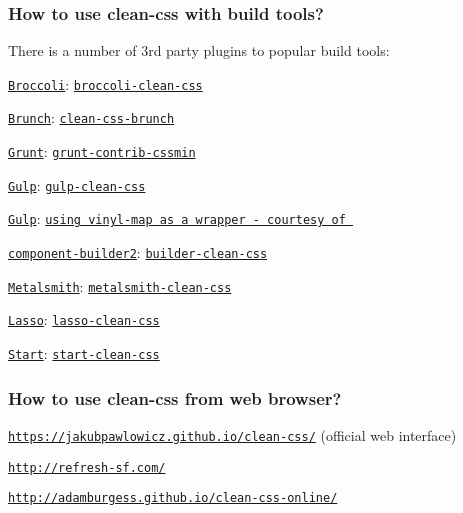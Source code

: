 \subsubsection*{How to use clean-\/css with build tools?}

There is a number of 3rd party plugins to popular build tools\+:


\begin{DoxyItemize}
\item \href{https://github.com/broccolijs/broccoli#broccoli}{\tt Broccoli}\+: \href{https://github.com/shinnn/broccoli-clean-css}{\tt broccoli-\/clean-\/css}
\item \href{http://brunch.io/}{\tt Brunch}\+: \href{https://github.com/brunch/clean-css-brunch}{\tt clean-\/css-\/brunch}
\item \href{http://gruntjs.com}{\tt Grunt}\+: \href{https://github.com/gruntjs/grunt-contrib-cssmin}{\tt grunt-\/contrib-\/cssmin}
\item \href{http://gulpjs.com/}{\tt Gulp}\+: \href{https://github.com/scniro/gulp-clean-css}{\tt gulp-\/clean-\/css}
\item \href{http://gulpjs.com/}{\tt Gulp}\+: \href{https://github.com/jakubpawlowicz/clean-css/issues/342}{\tt using vinyl-\/map as a wrapper -\/ courtesy of }
\item \href{https://github.com/component/builder2.js}{\tt component-\/builder2}\+: \href{https://github.com/poying/builder-clean-css}{\tt builder-\/clean-\/css}
\item \href{http://metalsmith.io}{\tt Metalsmith}\+: \href{https://github.com/aymericbeaumet/metalsmith-clean-css}{\tt metalsmith-\/clean-\/css}
\item \href{https://github.com/lasso-js/lasso}{\tt Lasso}\+: \href{https://github.com/yomed/lasso-clean-css}{\tt lasso-\/clean-\/css}
\item \href{https://github.com/start-runner/start}{\tt Start}\+: \href{https://github.com/start-runner/clean-css}{\tt start-\/clean-\/css}
\end{DoxyItemize}

\subsubsection*{How to use clean-\/css from web browser?}


\begin{DoxyItemize}
\item \href{https://jakubpawlowicz.github.io/clean-css/}{\tt https\+://jakubpawlowicz.\+github.\+io/clean-\/css/} (official web interface)
\item \href{http://refresh-sf.com/}{\tt http\+://refresh-\/sf.\+com/}
\item \href{http://adamburgess.github.io/clean-css-online/}{\tt http\+://adamburgess.\+github.\+io/clean-\/css-\/online/}
\end{DoxyItemize}

